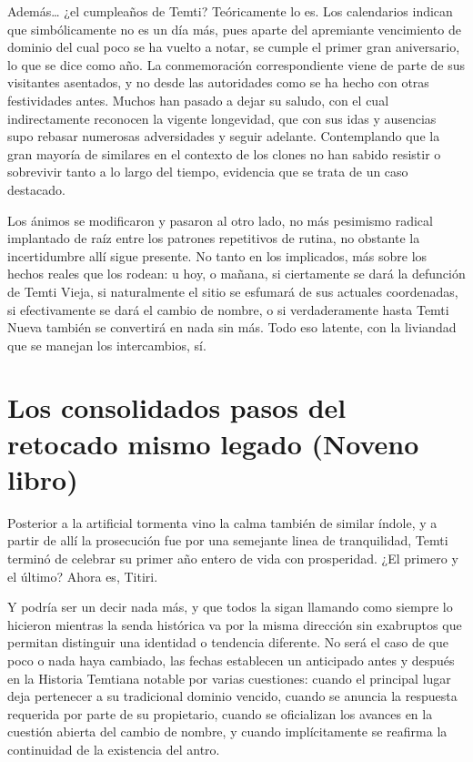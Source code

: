 \documentclass[
  spanish,
]{book}
\begin{document}
Además\ldots{} ¿el cumpleaños de Temti? Teóricamente lo es. Los calendarios indican que simbólicamente no es un día más, pues aparte del apremiante vencimiento de dominio del cual poco se ha vuelto a notar, se cumple el primer gran aniversario, lo que se dice como año. La conmemoración correspondiente viene de parte de sus visitantes asentados, y no desde las autoridades como se ha hecho con otras festividades antes. Muchos han pasado a dejar su saludo, con el cual indirectamente reconocen la vigente longevidad, que con sus idas y ausencias supo rebasar numerosas adversidades y seguir adelante. Contemplando que la gran mayoría de similares en el contexto de los clones no han sabido resistir o sobrevivir tanto a lo largo del tiempo, evidencia que se trata de un caso destacado.

Los ánimos se modificaron y pasaron al otro lado, no más pesimismo radical implantado de raíz entre los patrones repetitivos de rutina, no obstante la incertidumbre allí sigue presente. No tanto en los implicados, más sobre los hechos reales que los rodean: u hoy, o mañana, si ciertamente se dará la defunción de Temti Vieja, si naturalmente el sitio se esfumará de sus actuales coordenadas, si efectivamente se dará el cambio de nombre, o si verdaderamente hasta Temti Nueva también se convertirá en nada sin más. Todo eso latente, con la liviandad que se manejan los intercambios, sí.

\hypertarget{los-consolidados-pasos-del-retocado-mismo-legado-noveno-libro}{%
\chapter{Los consolidados pasos del retocado mismo legado (Noveno libro)}\label{los-consolidados-pasos-del-retocado-mismo-legado-noveno-libro}}

Posterior a la artificial tormenta vino la calma también de similar índole, y a partir de allí la prosecución fue por una semejante linea de tranquilidad, Temti terminó de celebrar su primer año entero de vida con prosperidad. ¿El primero y el último? Ahora es, Titiri.

Y podría ser un decir nada más, y que todos la sigan llamando como siempre lo hicieron mientras la senda histórica va por la misma dirección sin exabruptos que permitan distinguir una identidad o tendencia diferente. No será el caso de que poco o nada haya cambiado, las fechas establecen un anticipado antes y después en la Historia Temtiana notable por varias cuestiones: cuando el principal lugar deja pertenecer a su tradicional dominio vencido, cuando se anuncia la respuesta requerida por parte de su propietario, cuando se oficializan los avances en la cuestión abierta del cambio de nombre, y cuando implícitamente se reafirma la continuidad de la existencia del antro.
\end{document}
